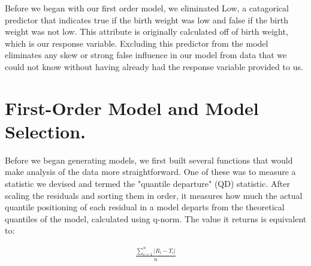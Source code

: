 \documentclass{article}\usepackage[]{graphicx}\usepackage[]{xcolor}
\begin{document}
Before we began with our first order model, we eliminated Low, a catagorical predictor that indicates true if the birth weight was low and false if the birth weight was not low. This attribute is originally calculated off of birth weight, which is our response variable. Excluding this predictor from the model eliminates any skew or strong false influence in our model from data that we could not know without having already had the response variable provided to us.

\section{First-Order Model and Model Selection.}

Before we began generating models, we first built several functions that would make analysis of the data more straightforward. One of these was to measure a statistic we devised and termed the "quantile departure" (QD) statistic. After scaling the residuals and sorting them in order, it measures how much the actual quantile positioning of each residual in a model departs from the theoretical quantiles of the model, calculated using q-norm. The value it returns is equivalent to: 

\begin{align*}
\frac{\sum_{i=1}^{n}|R_i - T_i|}{n}
\end{align*}
\end{document}
